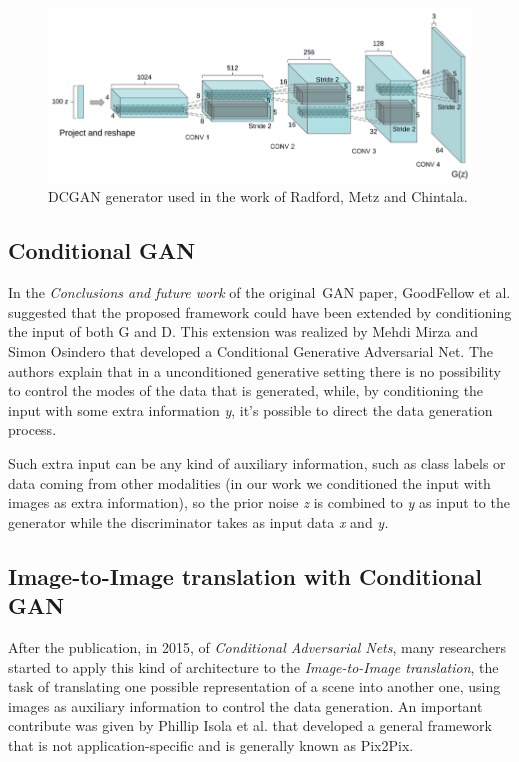 \begin{figure}[htbp!]
\centering
\includegraphics[height=0.25\textheight]{images/dcgan}
\caption[Layers from DCGAN, Radford, Metz, and Chintala]{DCGAN generator used in the work of Radford, Metz and Chintala.}
\label{fig:dcgan}
\end{figure}

\subsection{Conditional GAN}
\label{subsec:conditional_gan}
In the \textit{Conclusions and future work} of the original~\ac{GAN} paper\cite{cgan}, GoodFellow et al. suggested that the proposed framework could have been extended by conditioning the input of both G and D.
This extension was realized by Mehdi Mirza and Simon Osindero that developed a Conditional Generative Adversarial Net.
The authors explain that in a unconditioned generative setting there is no possibility to control the modes of the data that is generated, while, by conditioning the input with some extra information \textit{y}, it's possible to direct the data generation process\cite{cgan}.

Such extra input can be any kind of auxiliary information, such as class labels or data coming from other modalities (in our work we conditioned the input with images as extra information), so the prior noise \textit{z} is combined to \textit{y} as input to the generator while the discriminator takes as input data \textit{x} and \textit{y.}


\subsection{Image-to-Image translation with Conditional GAN}
\label{subsec:image-to-image_translation}
After the publication, in 2015, of \textit{Conditional Adversarial Nets}\cite{cgan}, many researchers started to apply this kind of architecture to the \textit{Image-to-Image translation}, the task of translating one possible representation of a scene into another one,  using images as auxiliary information to control the data generation. An important contribute was given by Phillip Isola et al. that developed a general framework that is not application-specific and is generally known as Pix2Pix\cite{pix2pix}.

